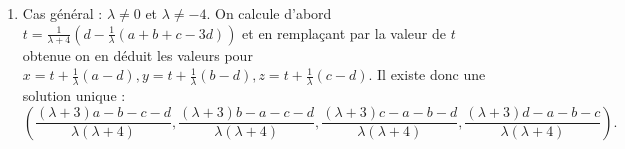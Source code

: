 {{\begin{enumerate}
Si $\lambda=-4$ et $a+b+c+d=0$ alors existe une infinité de solutions :
$$\left\{\Big(t-\frac{a-d}{4}, t-\frac{b-d}{4}, t-\frac{c-d}{4}, t\Big) \mid t\in\Rr \right\}.$$

  \item Cas général : $\lambda\neq 0$ et $\lambda\neq -4$.
On calcule d'abord $t= \frac{1}{\lambda+4}\left(d - \frac 1\lambda(a+b+c-3d)\right)$ 
et en remplaçant par la valeur de $t$ obtenue on en 
déduit les valeurs pour 
$x=t+\frac1\lambda(a-d),y=t+\frac1\lambda(b-d),z=t+\frac1\lambda(c-d)$. Il existe donc une solution unique :
$$\left(\frac{(\lambda+3)a-b-c-d}{\lambda(\lambda+4)}, \frac{(\lambda+3)b-a-c-d}{\lambda(\lambda+4)}, \frac{(\lambda+3)c-a-b-d}{\lambda(\lambda+4)},\frac{(\lambda+3)d-a-b-c}{\lambda(\lambda+4)}\right).$$

\end{enumerate}}
}